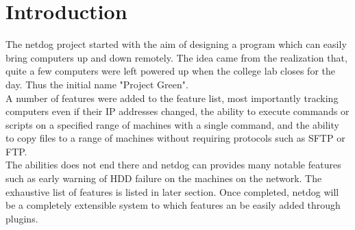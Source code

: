 \chapter{Introduction}
	
\par
The netdog project started with the aim of designing a program which can easily
bring computers up and down remotely. The idea came from the realization that,
quite a few computers were left powered up when the college lab closes for the
day. Thus the initial name "Project Green".\\

A number of features were added to the feature list, most importantly tracking
computers even if their IP addresses changed, the ability to execute commands
or scripts on a specified range of machines with a single command, and the
ability to copy files to a range of machines without requiring protocols such
as SFTP or FTP.\\

The abilities does not end there and netdog can provides many notable features
such as early warning of HDD failure on the machines on the network. The
exhaustive list of features is listed in later section. Once completed, netdog
will be a completely extensible system to which features an be easily added
through plugins.\\
\newpage 
